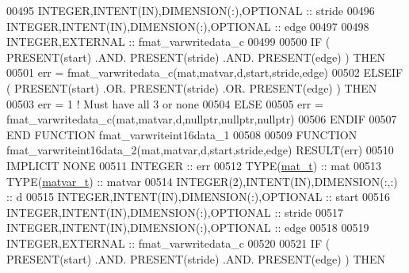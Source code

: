 \begin{DoxyCode}
00495     \textcolor{keywordtype}{INTEGER},\textcolor{keywordtype}{INTENT(IN)},\textcolor{keywordtype}{DIMENSION(:)},\textcolor{keywordtype}{OPTIONAL} :: stride
00496     \textcolor{keywordtype}{INTEGER},\textcolor{keywordtype}{INTENT(IN)},\textcolor{keywordtype}{DIMENSION(:)},\textcolor{keywordtype}{OPTIONAL} :: edge
00497 
00498     \textcolor{keywordtype}{INTEGER},\textcolor{keywordtype}{EXTERNAL}                         :: fmat\_varwritedata\_c
00499 
00500     \textcolor{keywordflow}{IF} ( \textcolor{keyword}{PRESENT}(start) .AND. \textcolor{keyword}{PRESENT}(stride) .AND. \textcolor{keyword}{PRESENT}(edge) ) \textcolor{keywordflow}{THEN}
00501         err = fmat\_varwritedata\_c(mat,matvar,d,start,stride,edge)
00502     \textcolor{keywordflow}{ELSEIF} ( \textcolor{keyword}{PRESENT}(start) .OR. \textcolor{keyword}{PRESENT}(stride) .OR. \textcolor{keyword}{PRESENT}(edge) ) \textcolor{keywordflow}{THEN}
00503         err = 1    \textcolor{comment}{! Must have all 3 or none}
00504     \textcolor{keywordflow}{ELSE}
00505         err = fmat\_varwritedata\_c(mat,matvar,d,nullptr,nullptr,nullptr)
00506 \textcolor{keywordflow}{    ENDIF}
00507 \textcolor{keyword}{END FUNCTION }fmat\_varwriteint16data\_1
00508 
00509 \textcolor{keyword}{FUNCTION }fmat\_varwriteint16data\_2(mat,matvar,d,start,stride,edge) \textcolor{keyword}{RESULT}(err)
00510 \textcolor{keywordtype}{IMPLICIT NONE}
00511     \textcolor{keywordtype}{INTEGER}                                  :: err
00512     \textcolor{keywordtype}{TYPE}(\hyperlink{group___m_a_t_gab0fc888f5a5d79943b16284b1f91c2e8}{mat\_t})                              :: mat
00513     \textcolor{keywordtype}{TYPE}(\hyperlink{group___m_a_t_structmatvar__t}{matvar\_t})                           :: matvar
00514     \textcolor{keywordtype}{INTEGER(2)},\textcolor{keywordtype}{INTENT(IN)},\textcolor{keywordtype}{DIMENSION(:,:)}     :: d
00515     \textcolor{keywordtype}{INTEGER},\textcolor{keywordtype}{INTENT(IN)},\textcolor{keywordtype}{DIMENSION(:)},\textcolor{keywordtype}{OPTIONAL} :: start
00516     \textcolor{keywordtype}{INTEGER},\textcolor{keywordtype}{INTENT(IN)},\textcolor{keywordtype}{DIMENSION(:)},\textcolor{keywordtype}{OPTIONAL} :: stride
00517     \textcolor{keywordtype}{INTEGER},\textcolor{keywordtype}{INTENT(IN)},\textcolor{keywordtype}{DIMENSION(:)},\textcolor{keywordtype}{OPTIONAL} :: edge
00518 
00519     \textcolor{keywordtype}{INTEGER},\textcolor{keywordtype}{EXTERNAL}                         :: fmat\_varwritedata\_c
00520 
00521     \textcolor{keywordflow}{IF} ( \textcolor{keyword}{PRESENT}(start) .AND. \textcolor{keyword}{PRESENT}(stride) .AND. \textcolor{keyword}{PRESENT}(edge) ) \textcolor{keywordflow}{THEN}

\end{DoxyCode}
